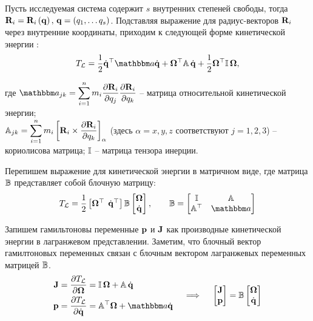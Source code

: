 Пусть исследуемая система содержит $s$ внутренних степеней свободы, тогда $\mathbf{R}_i = \mathbf{R}_i \left( \mathbf{q} \right), \, \mathbf{q} = \left( q_1, \dots q_s \right)$. Подставляя выражение для радиус-векторов $\mathbf{R}_i$ через внутренние координаты, приходим к следующей форме кинетической энергии \cite{petrov2015}:
\vverh
\begin{gather}
	T_\mL = \frac{1}{2} \dot{\mf{q}}^\top \bba \dot{\mf{q}} + \mf{\Omega}^\top \bbA \, \dot{\mf{q}} + \frac{1}{2} \mf{\Omega}^\top \bbI \, \mf{\Omega}, \notag
\end{gather}

где $\bba_{jk} = \displaystyle \sum_{i=1}^{n} m_i \displaystyle \frac{\partial \mf{R}_i}{\partial q_j} \frac{\partial \mf{R}_i}{\partial q_k}$ -- матрица относительной кинетической энергии; \\ 
$\mathbb{A}_{jk} = \displaystyle \sum_{i=1}^{n} m_i \left[ \mathbf{R}_i \times \displaystyle \frac{\partial \mathbf{R}_i}{\partial q_k} \right]_\alpha$ (здесь $\alpha = x, y, z$ соответствуют $j = 1, 2, 3$) -- кориолисова матрица; $\mathbb{I}$ -- матрица тензора инерции. \par
Перепишем выражение для кинетической энергии в матричном виде, где матрица $\mathbb{B}$ представляет собой блочную матрицу:
\vverh
\begin{gather}
	T_\mL = \frac{1}{2}
	\begin{bmatrix}
		\mf{\Omega}^\top & \hspace*{-2mm} \dot{\mf{q}}^\top
	\end{bmatrix}
	\bbB
	\begin{bmatrix}
		\mf{\Omega} \\ 
		\dot{\mf{q}}
	\end{bmatrix},
	\quad \quad
	\bbB = 
	\begin{bmatrix}
		\bbI & \bbA \\
		\bbA^\top & \bba
	\end{bmatrix}
	\notag
\end{gather}

Запишем гамильтоновы переменные $\mathbf{p}$ и $\mathbf{J}$ как производные кинетической энергии в лагранжевом представлении. Заметим, что блочный вектор гамилтоновых переменных связан с блочным вектором лагранжевых переменных матрицей $\mathbb{B}$.
\vverh
\begin{gather}
	\begin{aligned}
		\mf{J} &= \frac{\partial T_\mL}{\partial \mf{\Omega}} = \bbI \, \mf{\Omega} + \bbA \, \dot{\mf{q}} \\
		\mf{p} &= \frac{\partial T_\mL}{\partial \dot{\mf{q}}} = \bbA^\top \mf{\Omega} + \bba \dot{\mf{q}}
	\end{aligned}
	\quad \implies \quad
	\begin{bmatrix}
		\mf{J} \\
		\mf{p}
	\end{bmatrix} = 
	\bbB
	\begin{bmatrix}
		\mf{\Omega} \\
		\dot{\mf{q}}
	\end{bmatrix} \notag
\end{gather}

